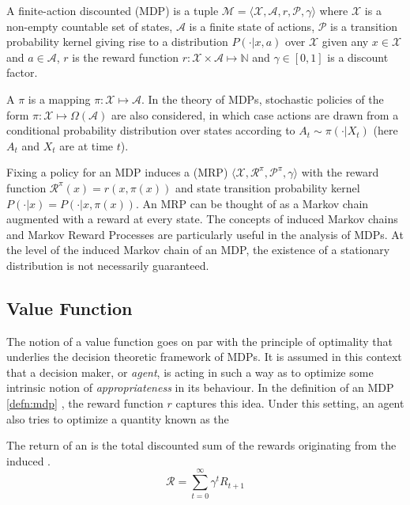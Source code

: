 \begin{defn}
\label{defn:mdp}
A finite-action discounted  (MDP) is a tuple
$\mathcal{M} = \langle \mathcal{X}, \mathcal{A}, r, \mathcal{P},\gamma \rangle$ where
$\mathcal{X}$ is a non-empty countable set of states, $\mathcal{A}$ is a finite state
of actions, $\mathcal{P}$ is a transition probability kernel giving rise to a distribution
$P(\cdot |x, a)$ over $\mathcal{X}$ given any $x \in \mathcal{X}$ and $a \in
\mathcal{A}$,  $r$ is the reward function $r: \mathcal{X} \times \mathcal{A} \mapsto
\mathbb{N}$ and $\gamma \in [0, 1]$ is a discount factor.
\end{defn}

A  $\pi$ is a mapping $\pi : \mathcal{X} \mapsto
\mathcal{A}$. In the theory of MDPs, stochastic policies of the form $\pi : \mathcal{X}
\mapsto \Omega(\mathcal{A})$ are also considered, in which case actions are
drawn from a conditional probability distribution  over states according to $A_t \sim
\pi(\cdot | X_t)$ (here $A_t$ and $X_t$ are \rvs at time $t$). 

Fixing a policy for an MDP  induces a 
(MRP) $\langle \mathcal{X}, \mathcal{R}^\pi, \mathcal{P}^\pi, \gamma \rangle$ with
the reward function $\mathcal{R}^\pi(x) = r(x, \pi(x))$ and state transition probability
kernel $P(\cdot | x) = P(\cdot | x, \pi(x))$. An MRP can be thought of as a Markov chain
augmented with a reward at every state. The concepts of induced Markov
chains and Markov Reward Processes are particularly useful in the analysis of 
MDPs. At the level of the induced Markov chain of an MDP, the
existence of a stationary distribution is not necessarily guaranteed.

\subsection{Value Function}
The notion of a value function goes on par with the principle of optimality
that underlies the decision theoretic framework of MDPs. It is assumed in this context
that a decision maker, or \textit{agent}, is acting in such a way as to optimize some
intrinsic notion of \textit{appropriateness} in its behaviour. In the definition
of an MDP \ref{defn:mdp} , the reward function $r$ captures this idea. Under this setting, an agent also tries to optimize a quantity known as the 

\begin{defn}
The return of an \mdp is the total discounted sum of the rewards originating from
the induced \mrp.
\begin{equation}
\mathcal{R} = \sum_{t=0}^\infty \gamma^t R_{t+1} \label{eq:return}
\end{equation}
\end{defn}


